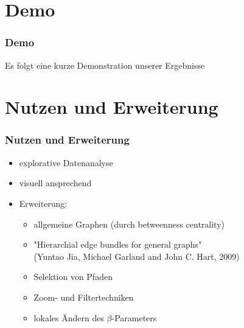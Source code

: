 \documentclass[11pt]{beamer}
\begin{document}
\section{Demo}
\begin{frame}
\frametitle{Demo}

Es folgt eine kurze Demonstration unserer Ergebnisse

\end{frame}


\section{Nutzen und Erweiterung}
\begin{frame}
\frametitle{Nutzen und Erweiterung}

\begin{itemize}
\item explorative Datenanalyse
\item visuell ansprechend
\item Erweiterung:
\begin{itemize} 
\item allgemeine Graphen (durch betweenness centrality)
\item "Hierarchial edge bundles for general graphs" 
\\(Yuntao Jia, Michael Garland and John C. Hart, 2009)
\item Selektion von Pfaden
\item Zoom- und Filtertechniken
\item lokales Ändern des $\beta$-Parameters 
\end{itemize}
\end{itemize}

\end{frame}
\end{document}
